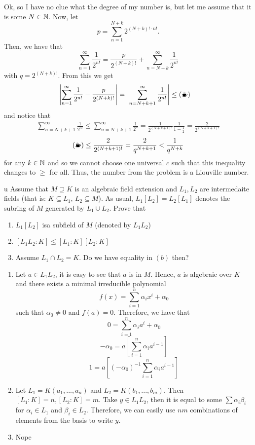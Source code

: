\documentclass{article}
\begin{document}
Ok, so I have no clue what the degree of my number is, but let me assume that it is some $N\in\mathbb{N}$. Now, let
$$p=\sum\limits_{n=1}^{N+k}2^{(N+k)!\cdot n!}.$$
Then, we have that
$$\sum\limits_{n=1}^\infty\frac{1}{2^{n!}}=\frac{p}{2^{(N+k)!}}+\sum\limits_{n=N+k}^\infty \frac{1}{2^{n!}}$$
with $q=2^{(N+k)!}$. From this we get
\begin{align*}
    \left|\sum\limits_{n=1}^\infty\frac{1}{2^{n!}}-\frac{p}{2^{(N+k)!}}\right|&=\left|\sum\limits_{n=N+k+1}^\infty\frac{1}{2^{n!}}\right|\leq\text{(\Coffeecup)}
\end{align*}
and notice that
\begin{align*}
    \sum\limits_{n=N+k+1}^\infty\frac{1}{2^{n!}}\leq \sum\limits_{n=N+k+1}^\infty\frac{1}{2^n}=\frac{1}{2^{(N+k+1)!}}\frac{1}{1-\frac12}=\frac{2}{2^{(N+k+1)!}}
\end{align*}
\begin{align*}
    \text{(\Coffeecup)}\leq\frac{2}{2^{(N+k+1)!}}=\frac{2}{q^{N+k+1}}<\frac{1}{q^{N+k}}  
\end{align*}
for any $k\in\mathbb{N}$ and so we cannot choose one universal $c$ such that this inequality changes to $\geq$ for all. Thus, the number from the problem is a Liouville number.

\begin{problem}[8]{u}
Assume that $M\supseteq K$ is an algebraic field extension and $L_1,L_2$ are intermedaite fields (that is: $K\subseteq L_1$, $L_2\subseteq M$). As usual, $L_1[L_2]=L_2[L_1]$ denotes the subring of $M$ generated by $L_1\cup L_2$. Prove that
\begin{enumerate}[leftmargin=*,label=(\alph*)]
    \item $L_1[L_2]$ isa subfield of $M$ (denoted by $L_1L_2$)
    \item $[L_1L_2:K]\leq [L_1:K][L_2:K]$
    \item Assume $L_1\cap L_2=K$. Do we have equality in $(b)$ then?
\end{enumerate}
\end{problem}

\begin{enumerate}[leftmargin=*,label=(\alph*)]
    \item Let $a\in L_1L_2$, it is easy to see that $a$ is in $M$. Hence, $a$ is algebraic over $K$ and there exists a minimal irreducible polynomial 
    $$f(x)=\sum_{i=1}^n\alpha_ix^i+\alpha_0$$
    such that $\alpha_0\neq0$ and $f(a)=0$. Therefore, we have that
    $$0=\sum_{i=1}^n\alpha_ia^i+\alpha_0$$
    $$-\alpha_0=a\left[\sum_{i=1}^n\alpha_ia^{i-1}\right]$$
    $$1=a\left[(-\alpha_0)^{-1}\sum_{i=1}^n\alpha_ia^{i-1}\right]$$
    \item Let $L_1=K(a_1,...,a_n)$ and $L_2=K(b_1,...,b_m)$. Then $[L_1:K]=n,[L_2:K]=m$. Take $y\in L_1L_2$, then it is equal to some $\sum \alpha_i\beta_i$ for $\alpha_i\in L_1$ and $\beta_i\in L_2$. Therefore, we can easily use $nm$ combinations of elements from the basis to write $y$.
    \item Nope
\end{enumerate}
\end{document}
